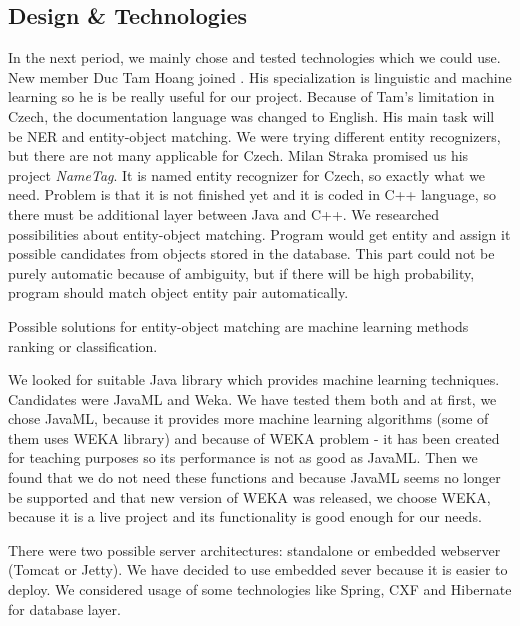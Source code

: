 \subsection{Design \& Technologies}
In the next period, we mainly chose and tested technologies which we could use.
New member Duc Tam Hoang joined \textan{}. His specialization is linguistic and
machine learning so he is be really useful for our project. Because of Tam's
limitation in Czech, the documentation language was changed to English. His main
task will be NER and entity-object matching. We were trying different
entity recognizers, but there are not many applicable for Czech. Milan Straka
promised us his project \emph{NameTag}. It is named entity recognizer for Czech,
so exactly what we need. Problem is that it is not finished yet and it is coded
in C++ language, so there must be additional layer between Java and C++.
We researched possibilities about entity-object matching. Program would get
entity and assign it possible candidates from objects stored in the database.
This part could not be purely automatic because of ambiguity, but if there will
be high probability, program should match object entity pair automatically.

Possible solutions for entity-object matching are machine learning methods
ranking or classification.

We looked for suitable Java library which provides machine learning techniques.
Candidates were JavaML and Weka. We have tested them both and at first, we chose
JavaML, because it provides more machine learning algorithms (some of them uses
WEKA library) and because of WEKA problem - it has been created for teaching
purposes so its performance is not as good as JavaML. Then we found that we
do not need these functions and because JavaML seems no longer be supported and
that new version of WEKA was released, we choose WEKA, because it is a live
project and its functionality is good enough for our needs.

There were two possible server architectures: standalone or embedded webserver
(Tomcat or Jetty). We have decided to use embedded sever because it is easier to
deploy. We considered usage of some technologies like Spring, CXF and
Hibernate for database layer.

